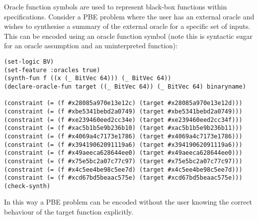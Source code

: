 \documentclass[english,a4paper,10pt]{article}
\begin{document}
\begin{example}
Oracle function symbols are used to represent black-box functions within specifications. Consider a PBE problem where the user has an external oracle and wishes to synthesise a summary of the external oracle for a specific set of inputs. This can be encoded
using an oracle function symbol (note this is syntactic sugar for an oracle assumption and an uninterpreted function):
\begin{lstlisting}[language=SyGuS]
(set-logic BV)
(set-feature :oracles true) 
(synth-fun f ((x (_ BitVec 64))) (_ BitVec 64))
(declare-oracle-fun target ((_ BitVec 64)) (_ BitVec 64) binaryname)

(constraint (= (f #x28085a970e13e12c) (target #x28085a970e13e12d)))
(constraint (= (f #xbe5341bebd2a0749) (target #xbe5341bebd2a0749)))
(constraint (= (f #xe239460eed2cc34e) (target #xe239460eed2cc34f)))
(constraint (= (f #xac5b1b5e9b236b10) (target #xac5b1b5e9b236b11)))
(constraint (= (f #x4069a4c7173e1786) (target #x4069a4c7173e1786)))
(constraint (= (f #x39419062091119a6) (target #x39419062091119a6)))
(constraint (= (f #x49aeeca628644ee0) (target #x49aeeca628644ee0)))
(constraint (= (f #x75e5bc2a07c77c97) (target #x75e5bc2a07c77c97)))
(constraint (= (f #x4c5ee4be98c5ee7d) (target #x4c5ee4be98c5ee7d)))
(constraint (= (f #xcd67bd5beaac575e) (target #xcd67bd5beaac575e)))
(check-synth)
\end{lstlisting}
In this way a PBE problem can be encoded without the user knowing the correct behaviour of the target function explicitly.
\end{example}
\end{document}
